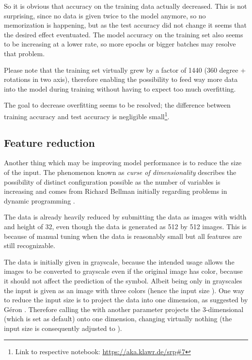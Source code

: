 So it is obvious that accuracy on the training data actually decreased.
This is not surprising, since no data is given twice to the model anymore, so no memorization is happening, but as the test accuracy did not change it seems that the desired effect eventuated.
The model accuracy on the training set also seems to be increasing at a lower rate, so more epochs or bigger batches may resolve that problem.

Please note that the training set virtually grew by a factor of 1440 (360 degree + rotations in two axis), therefore enabling the possibility to feed way more data into the model during training without having to expect too much overfitting.

The goal to decrease overfitting seems to be resolved; the difference between training accuracy and test accuracy is negligible small\footnote{Link to respective notebook: \url{https://aka.klawr.de/srp\#7}}.

\subsection{Feature reduction}
Another thing which may be improving model performance is to reduce the size of the input.
The phenomenon known as \textit{curse of dimensionality} describes the possibility of distinct configuration possible as the number of variables is increasing and comes from Richard Bellman initially regarding problems in dynamic programming \cite[p.ix]{Bellman1957}.

The data is already heavily reduced by submitting the data as images with width and height of 32, even though the data is generated as 512 by 512 images. This is because of manual tuning when the data is reasonably small but all features are still recognizable.


The data is initially given in grayscale, because the intended usage allows the images to be converted to grayscale even if the original image has color, because it should not affect the prediction of the symbol.
Albeit being only in grayscales the input is given as an image with three colors (hence the input size \code{[32, 32, 3]}).
One way to reduce the input size is to project the data into one dimension, as suggested by Géron \cite[p.215]{Geron2019}.
Therefore calling the  with another parameter  projects the 3-dimensional  (which is set as default) onto one dimension, changing virtually nothing (the input size is consequently adjusted to \code{[32, 32, 1]}).

